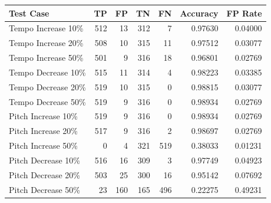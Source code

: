 \begin{table}[H]
    \begin{tabular}{|L|r|r|r|r|r|r|}
        \hline
        \vspace{5pt}\textbf{Test Case}\vspace{5pt}                & \textbf{TP}   & \textbf{FP} & \textbf{TN} & \textbf{FN} & \textbf{Accuracy} & \textbf{FP Rate} \\ \hline
        Tempo Increase 10\%                & 512         & 13          & 312         & 7           & 0.97630           & 0.04000          \\ \hline
        Tempo Increase 20\%                & 508         & 10          & 315         & 11          & 0.97512           & 0.03077          \\ \hline
        Tempo Increase 50\%                & 501         & 9           & 316         & 18          & 0.96801           & 0.02769          \\ \hline
        Tempo Decrease 10\%                & 515         & 11          & 314         & 4           & 0.98223           & 0.03385          \\ \hline
        Tempo Decrease 20\%                & 519         & 10          & 315         & 0           & 0.98815           & 0.03077          \\ \hline
        Tempo Decrease 50\%                & 519         & 9           & 316         & 0           & 0.98934           & 0.02769          \\ \hline
        Pitch Increase 10\%                & 519         & 9           & 316         & 0           & 0.98934           & 0.02769          \\ \hline
        Pitch Increase 20\%                & 517         & 9           & 316         & 2           & 0.98697           & 0.02769          \\ \hline
        Pitch Increase 50\%                & 0           & 4           & 321         & 519         & 0.38033           & 0.01231          \\ \hline
        Pitch Decrease 10\%                & 516         & 16          & 309         & 3           & 0.97749           & 0.04923          \\ \hline
        Pitch Decrease 20\%                & 503         & 25          & 300         & 16          & 0.95142           & 0.07692          \\ \hline
        Pitch Decrease 50\%                & 23          & 160         & 165         & 496         & 0.22275           & 0.49231          \\ \hline

\end{tabular}
\end{table}
